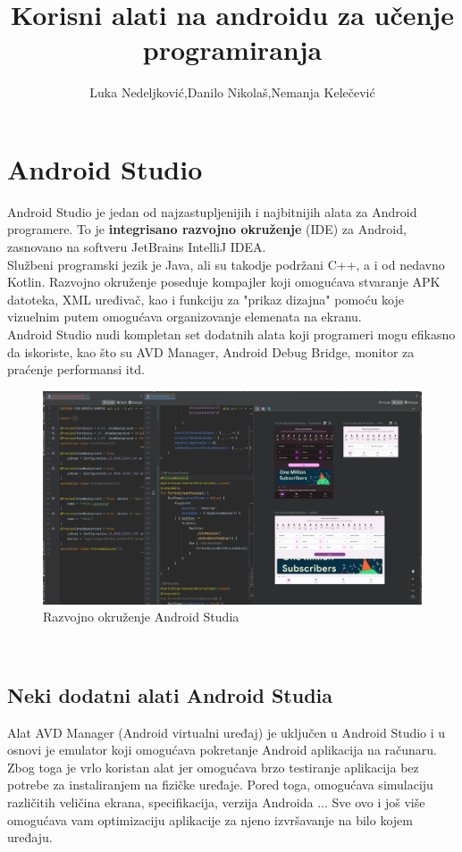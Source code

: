 \documentclass{article}
\title{Korisni alati na androidu za učenje programiranja}
\author{Luka Nedeljković,Danilo Nikolaš,Nemanja Kelečević }
\begin{document}
\section{Android Studio}
Android Studio je jedan od najzastupljenijih i najbitnijih alata za Android programere. To je \textbf{integrisano razvojno okruženje} (IDE) za Android, zasnovano na softveru JetBrains IntelliJ IDEA. \\
Službeni programski jezik je Java, ali su takodje podržani C++, a i od nedavno Kotlin. Razvojno okruženje poseduje kompajler koji omogućava stvaranje APK datoteka, XML uređivač, kao i funkciju za "prikaz dizajna" pomoću koje vizuelnim putem omogućava organizovanje elemenata na ekranu. \\
Android Studio nudi kompletan set dodatnih alata koji programeri mogu efikasno da iskoriste, kao što su AVD Manager, Android Debug Bridge, monitor za praćenje performansi itd.\\

\begin{figure}[ht!]
    \centering
    \includegraphics[scale=0.3]{android_studio_interface.png}
    \caption{Razvojno okruženje Android Studia}
\end{figure}
\\
\subsection{Neki dodatni alati Android Studia}
Alat AVD Manager (Android virtualni uređaj) je uključen u Android Studio i u osnovi je emulator koji omogućava pokretanje Android aplikacija na računaru. Zbog toga je vrlo koristan alat jer omogućava brzo testiranje aplikacija bez potrebe za instaliranjem na fizičke uređaje. Pored toga, omogućava simulaciju različitih veličina ekrana, specifikacija, verzija Androida ... Sve ovo i još više omogućava vam optimizaciju aplikacije za njeno izvršavanje na bilo kojem uređaju.
\end{document}
